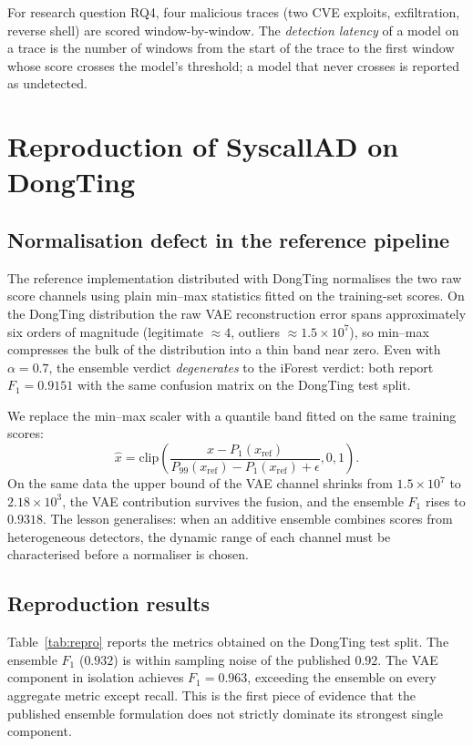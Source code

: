 For research question RQ4, four malicious traces (two CVE exploits,
exfiltration, reverse shell) are scored window-by-window. The
\emph{detection latency} of a model on a trace is the number of
windows from the start of the trace to the first window whose score
crosses the model's threshold; a model that never crosses is reported
as undetected.

\FloatBarrier
\section{Reproduction of SyscallAD on DongTing}
\label{sec:reproduction}

\subsection{Normalisation defect in the reference pipeline}
\label{subsec:normfix}
The reference implementation distributed with DongTing normalises the
two raw score channels using plain min--max statistics fitted on the
training-set scores. On the DongTing distribution the raw VAE
reconstruction error spans approximately six orders of magnitude
(legitimate $\approx\!4$, outliers $\approx\!1.5\times10^{7}$), so
min--max compresses the bulk of the distribution into a thin band
near zero. Even with $\alpha=0.7$, the ensemble verdict
\emph{degenerates} to the iForest verdict: both report
$F_{1}=0.9151$ with the same confusion matrix on the DongTing test
split.

We replace the min--max scaler with a quantile band fitted on the
same training scores:
\begin{equation}
\hat{x} = \mathrm{clip}\!\left(\frac{x - P_{1}(x_{\text{ref}})}
                                    {P_{99}(x_{\text{ref}}) -
                                     P_{1}(x_{\text{ref}}) + \epsilon},
                               0, 1\right).
\label{eq:robust}
\end{equation}
On the same data the upper bound of the VAE channel shrinks from
$1.5\times10^{7}$ to $2.18\times10^{3}$, the VAE contribution
survives the fusion, and the ensemble $F_{1}$ rises to
$0.9318$. The lesson generalises: when an additive ensemble combines
scores from heterogeneous detectors, the dynamic range of each
channel must be characterised before a normaliser is chosen.

\subsection{Reproduction results}
Table~\ref{tab:repro} reports the metrics obtained on the DongTing
test split. The ensemble $F_{1}$ ($0.932$) is within sampling noise of
the published $0.92$. The VAE component in isolation achieves
$F_{1}=0.963$, exceeding the ensemble on every aggregate metric except
recall. This is the first piece of evidence that the published
ensemble formulation does not strictly dominate its strongest single
component.

